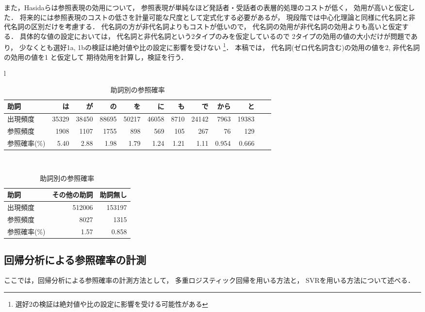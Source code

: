 また，Hasidaらは参照表現の効用について，
参照表現が単純なほど発話者・受話者の表層的処理のコストが低く，
効用が高いと仮定した．
将来的には参照表現のコストの低さを計量可能な尺度として定式化する必要があるが，
現段階では中心化理論と同様に代名詞と非代名詞の区別だけを考慮する．
代名詞の方が非代名詞よりもコストが低いので，
代名詞の効用が非代名詞の効用よりも高いと仮定する．
具体的な値の設定においては，
代名詞と非代名詞という2タイプのみを仮定しているので
2タイプの効用の値の大小だけが問題であり，
少なくとも選好1a, 1bの検証は絶対値や比の設定に影響を受けない
\footnote{選好2の検証は絶対値や比の設定に影響を受ける可能性がある}．
本稿では，
代名詞(ゼロ代名詞含む)の効用の値を2, 非代名詞の効用の値を1 と仮定して
期待効用を計算し，検証を行う．
\begin{table}[tb]
\begin{center}
\begin{tabular}{l}
\begin{tabular}{|l|r|r|r|r|r|r|r|r|r|r|r|}
\hline
助詞&は&が&の&を&に&も&で&から&と\\
\hline
出現頻度&35329&38450&88695&50217&46058&8710&24142&7963&19383\\
参照頻度&1908&1107&1755&898&569&105&267&76&129\\
参照確率(\%)&5.40&2.88&1.98&1.79&1.24&1.21&1.11&0.954&0.666\\
\hline
\end{tabular}\\
\begin{tabular}{|l|r|r|}
\hline
助詞&その他の助詞&助詞無し\\
\hline
出現頻度&512006&153197\\
参照頻度&8027&1315\\
参照確率(\%)&1.57&0.858\\
\hline
\end{tabular}
\end{tabular}
\end{center}
\caption{助詞別の参照確率}
\label{tab:gramfunc_order}
\end{table}






\subsection{回帰分析による参照確率の計測}

ここでは，回帰分析による参照確率の計測方法として，
多重ロジスティック回帰を用いる方法と，
SVRを用いる方法について述べる．


